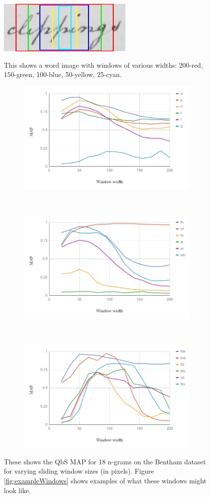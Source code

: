 \documentclass[ms,electronic,twosidetoc,letterpaper,chaptercenter,parttop,lof,lot]{byumsphd}
\begin{document}
\begin{figure}
    \centering
    \includegraphics[width=.33\textwidth]{exampleWindows}
    \caption{This shows a word image with windows of various widths: 200-red, 150-green, 100-blue, 50-yellow, 25-cyan.
    }
    \label{fig:exampleWindows}

    \centering
    \begin{subfigure}{.99\textwidth}
  \centering
  \includegraphics[width=.6\linewidth]{windowsizes1}
\end{subfigure}
\\
\begin{subfigure}{.99\textwidth}
  \centering
  \includegraphics[width=.6\linewidth]{windowsizes2}
\end{subfigure}
\\
\begin{subfigure}{.99\textwidth}
  \centering
  \includegraphics[width=.6\linewidth]{windowsizes3}
\end{subfigure}
    \caption{These shows the QbS MAP for 18 n-grams on the Bentham dataset for varying sliding window sizes (in pixels). Figure \ref{fig:exampleWindows} shows examples of what these windows might look like.
    }
    \label{fig:windowsizes}
\end{figure}
\end{document}
